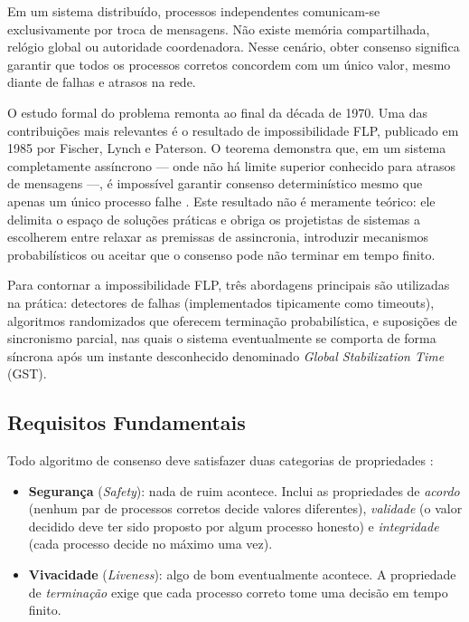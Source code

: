 \documentclass[12pt,a4paper]{report}
\begin{document}
Em um sistema distribuído, processos independentes comunicam-se exclusivamente por troca de mensagens. Não existe memória compartilhada, relógio global ou autoridade coordenadora. Nesse cenário, obter consenso significa garantir que todos os processos corretos concordem com um único valor, mesmo diante de falhas e atrasos na rede.

O estudo formal do problema remonta ao final da década de 1970. Uma das contribuições mais relevantes é o resultado de impossibilidade FLP, publicado em 1985 por Fischer, Lynch e Paterson. O teorema demonstra que, em um sistema completamente assíncrono --- onde não há limite superior conhecido para atrasos de mensagens ---, é impossível garantir consenso determinístico mesmo que apenas um único processo falhe \cite{Bashir2023}. Este resultado não é meramente teórico: ele delimita o espaço de soluções práticas e obriga os projetistas de sistemas a escolherem entre relaxar as premissas de assincronia, introduzir mecanismos probabilísticos ou aceitar que o consenso pode não terminar em tempo finito.

Para contornar a impossibilidade FLP, três abordagens principais são utilizadas na prática: detectores de falhas (implementados tipicamente como timeouts), algoritmos randomizados que oferecem terminação probabilística, e suposições de sincronismo parcial, nas quais o sistema eventualmente se comporta de forma síncrona após um instante desconhecido denominado \textit{Global Stabilization Time} (GST).

\subsection{Requisitos Fundamentais}

Todo algoritmo de consenso deve satisfazer duas categorias de propriedades \cite{Bashir2023}:

\begin{itemize}
    \item \textbf{Segurança} (\textit{Safety}): nada de ruim acontece. Inclui as propriedades de \textit{acordo} (nenhum par de processos corretos decide valores diferentes), \textit{validade} (o valor decidido deve ter sido proposto por algum processo honesto) e \textit{integridade} (cada processo decide no máximo uma vez).
    \item \textbf{Vivacidade} (\textit{Liveness}): algo de bom eventualmente acontece. A propriedade de \textit{terminação} exige que cada processo correto tome uma decisão em tempo finito.
\end{itemize}
\end{document}
